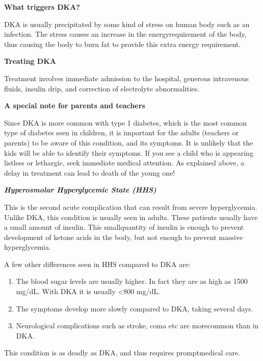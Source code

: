 \noindent\textbf{What triggers DKA?}

DKA is usually precipitated by some kind of stress on human body such as an infection. The stress causes an increase in the energy\break requirement of the body, thus causing the body to burn fat to provide this extra energy requirement.

\noindent\textbf{Treating DKA}

Treatment involves immediate admission to the hospital, gene\-rous intravenous fluids, insulin drip, and correction of electrolyte abnorma\-lities.

\noindent\textbf{A special note for parents and teachers}

Since DKA is more common with type 1 diabetes, which is the most common type of diabetes seen in children, it is important for the adults (teachers or parents) to be aware of this condition, and its symptoms. It is unlikely that the kids will be able to identify their symptoms. If you see a child who is appearing listless or lethargic, seek immediate medical attention. As explained above, a delay in treatment can lead to death of the young one!

\noindent\textbf{\textit{Hyperosmolar Hyperglycemic State (HHS)}}

This is the second acute complication that can result from severe hyperglycemia. Unlike DKA, this condition is usually seen in adults. These patients usually have a small amount of insulin. This small\break quantity of insulin is enough to prevent development of ketone acids in the body, but not enough to prevent massive hyperglycemia.

\noindent A few other differences seen in HHS compared to DKA are:

\begin{enumerate}[•]
\itemsep=0pt
\item The blood sugar levels are usually higher. In fact they are as high as 1500 mg/dL. With DKA it is usually \textless 800 mg/dL.
\item The symptoms develop more slowly compared to DKA, taking several days.
\item Neurological complications such as stroke, coma etc are more\break common than in DKA.
\end{enumerate}

This condition is as deadly as DKA, and thus requires prompt\break medical care.


